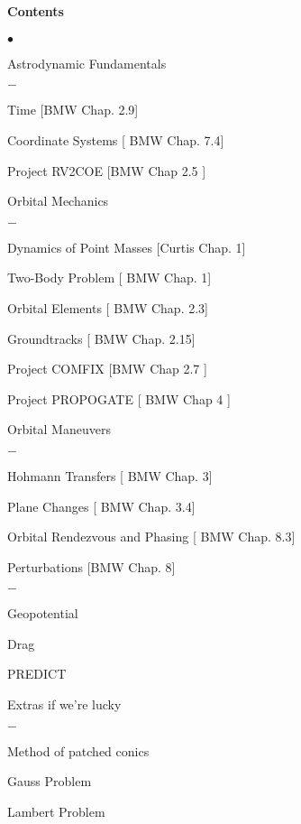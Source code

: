 \documentclass[10pt]{article}
\begin{document}
\paragraph*{Contents}
\begin{list}{$\bullet$}{\setlength{\itemsep}{-3pt}}
\item Astrodynamic Fundamentals
    \begin{list}{$-$}{\setlength{\itemsep}{-3pt}}
    \item Time [BMW Chap. 2.9]
    \item Coordinate Systems [ BMW Chap. 7.4]
    \item Project RV2COE [BMW Chap 2.5 ]
    \end{list}
\item Orbital Mechanics\vspace*{-0.2cm}
    \begin{list}{$-$}{\setlength{\itemsep}{-3pt}}
    \item Dynamics of Point Masses [Curtis Chap. 1]
    \item Two-Body Problem [ BMW Chap. 1]
    \item Orbital Elements [ BMW Chap. 2.3]
    \item Groundtracks [ BMW Chap. 2.15]
    \item Project COMFIX [BMW Chap 2.7 ]
    \item Project PROPOGATE [ BMW Chap 4 ]
    \end{list}
\item Orbital Maneuvers\vspace*{-0.2cm}
    \begin{list}{$-$}{\setlength{\itemsep}{-3pt}}
    \item Hohmann Transfers [ BMW Chap. 3]
    \item Plane Changes [ BMW Chap. 3.4]
    \item Orbital Rendezvous and Phasing [ BMW Chap. 8.3]
    \end{list}
\item Perturbations [BMW Chap. 8]\vspace*{-0.2cm}
    \begin{list}{$-$}{\setlength{\itemsep}{-3pt}}
    \item Geopotential 
    \item Drag
    \item PREDICT 
    \end{list}
\item Extras if we're lucky\vspace*{-0.2cm}
    \begin{list}{$-$}{\setlength{\itemsep}{-3pt}}
        \item Method of patched conics
        \item Gauss Problem
        \item Lambert Problem
    \end{list}
\end{list}
\end{document}
